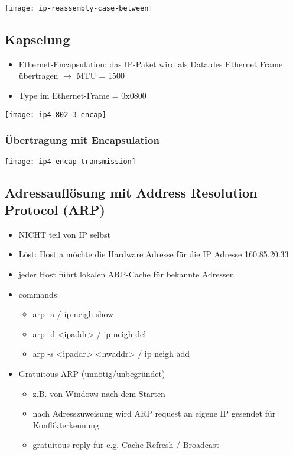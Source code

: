 \texttt{[image: ip-reassembly-case-between]}




\subsection{Kapselung}

\begin{itemize}
    \item Ethernet-Encapsulation: das IP-Paket wird als Data des Ethernet Frame übertragen $\rightarrow$ MTU = 1500
    \item Type im Ethernet-Frame = 0x0800
\end{itemize}

\texttt{[image: ip4-802-3-encap]}

\subsubsection{Übertragung mit Encapsulation}

\texttt{[image: ip4-encap-transmission]}




\subsection{Adressauflösung mit Address Resolution Protocol (ARP)}

\begin{itemize}
    \item NICHT teil von IP selbst
    \item Löst: Host a möchte die Hardware Adresse für die IP Adresse 160.85.20.33
    \item jeder Host führt lokalen ARP-Cache für bekannte Adressen
    \item commands:
          \begin{itemize}
              \item arp -a / ip neigh show
              \item arp -d <ipaddr> / ip neigh del
              \item arp -s <ipaddr> <hwaddr> / ip neigh add
          \end{itemize}
    \item Gratuitous ARP (unnötig/unbegründet)
          \begin{itemize}
              \item z.B. von Windows nach dem Starten
              \item nach Adresszuweisung wird ARP request an eigene IP gesendet
                    für Konflikterkennung
              \item gratuitous reply für e.g. Cache-Refresh / Broadcast
          \end{itemize}
\end{itemize}

